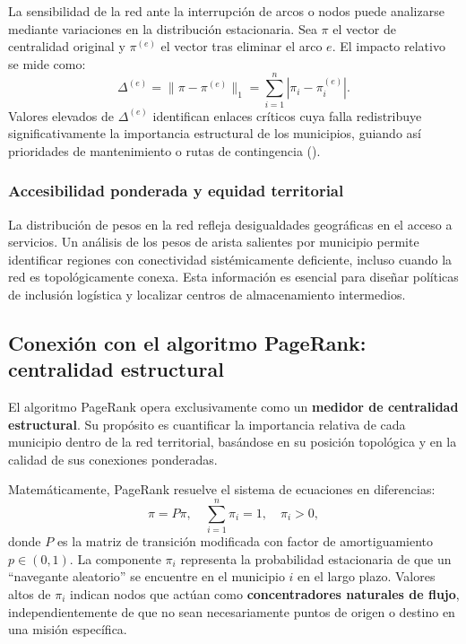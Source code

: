\documentclass[
  spanish,
  us-letterpaper,
]{scrreprt}
\numberwithin{equation}{section}
\begin{document}
La sensibilidad de la red ante la interrupción de arcos o nodos puede
analizarse mediante variaciones en la distribución estacionaria. Sea
\(\pi\) el vector de centralidad original y \(\pi^{(e)}\) el vector tras
eliminar el arco \(e\). El impacto relativo se mide como: \[
\Delta^{(e)} = \|\pi - \pi^{(e)}\|_1 = \sum_{i=1}^n |\pi_i - \pi_i^{(e)}|.
\] Valores elevados de \(\Delta^{(e)}\) identifican enlaces críticos
cuya falla redistribuye significativamente la importancia estructural de
los municipios, guiando así prioridades de mantenimiento o rutas de
contingencia ().

\subsubsection{Accesibilidad ponderada y equidad
territorial}\label{accesibilidad-ponderada-y-equidad-territorial}

La distribución de pesos en la red refleja desigualdades geográficas en
el acceso a servicios. Un análisis de los pesos de arista salientes por
municipio permite identificar regiones con conectividad sistémicamente
deficiente, incluso cuando la red es topológicamente conexa. Esta
información es esencial para diseñar políticas de inclusión logística y
localizar centros de almacenamiento intermedios.

\subsection{Conexión con el algoritmo PageRank: centralidad
estructural}\label{conexiuxf3n-con-el-algoritmo-pagerank-centralidad-estructural}

El algoritmo PageRank opera exclusivamente como un \textbf{medidor de
centralidad estructural}. Su propósito es cuantificar la importancia
relativa de cada municipio dentro de la red territorial, basándose en su
posición topológica y en la calidad de sus conexiones ponderadas.

Matemáticamente, PageRank resuelve el sistema de ecuaciones en
diferencias: \[
\pi = P\pi, \quad \sum_{i=1}^n \pi_i = 1, \quad \pi_i > 0,
\] donde \(P\) es la matriz de transición modificada con factor de
amortiguamiento \(p \in (0,1)\). La componente \(\pi_i\) representa la
probabilidad estacionaria de que un ``navegante aleatorio'' se encuentre
en el municipio \(i\) en el largo plazo. Valores altos de \(\pi_i\)
indican nodos que actúan como \textbf{concentradores naturales de
flujo}, independientemente de que no sean necesariamente puntos de
origen o destino en una misión específica.
\end{document}
